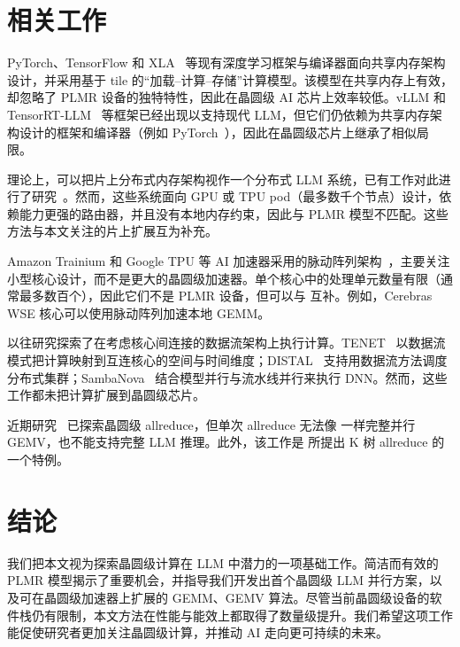 \section{相关工作}
\vspace{-0.2cm}

PyTorch、TensorFlow 和 XLA~\cite{pytorch,tensorflow,xla,flextensor,tvm,ansor,roller,rammer,welder,ladder} 等现有深度学习框架与编译器面向共享内存架构设计，并采用基于 tile 的“加载--计算--存储”计算模型。该模型在共享内存上有效，却忽略了 PLMR 设备的独特特性，因此在晶圆级 AI 芯片上效率较低。vLLM 和 TensorRT-LLM~\cite{vllm,tensorrt-llm} 等框架已经出现以支持现代 LLM，但它们仍依赖为共享内存架构设计的框架和编译器（例如 PyTorch~\cite{pytorch}），因此在晶圆级芯片上继承了相似局限。

 理论上，可以把片上分布式内存架构视作一个分布式 LLM 系统，已有工作对此进行了研究~\cite{alpa,alpaserver,vllm,google2023efficiently,tensorrt-llm,loongserve}。然而，这些系统面向 GPU 或 TPU pod（最多数千个节点）设计，依赖能力更强的路由器，并且没有本地内存约束，因此与 PLMR 模型不匹配。这些方法与本文关注的片上扩展互为补充。

 Amazon Trainium 和 Google TPU 等 AI 加速器采用的脉动阵列架构~\cite{resa}，主要关注小型核心设计，而不是更大的晶圆级加速器。单个核心中的处理单元数量有限（通常最多数百个），因此它们不是 PLMR 设备，但可以与 \sys 互补。例如，Cerebras WSE 核心可以使用脉动阵列加速本地 GEMM。

以往研究探索了在考虑核心间连接的数据流架构上执行计算。TENET~\cite{tenet} 以数据流模式把计算映射到互连核心的空间与时间维度；DISTAL~\cite{distal} 支持用数据流方法调度分布式集群；SambaNova~\cite{sambanova} 结合模型并行与流水线并行来执行 DNN。然而，这些工作都未把计算扩展到晶圆级芯片。

 近期研究~\cite{wafer-reduce} 已探索晶圆级 allreduce，但单次 allreduce 无法像 \sys 一样完整并行 GEMV，也不能支持完整 LLM 推理。此外，该工作是 \sys 所提出 K 树 allreduce 的一个特例。

\vspace{-0.3cm}
\section{结论}

我们把本文视为探索晶圆级计算在 LLM 中潜力的一项基础工作。简洁而有效的 PLMR 模型揭示了重要机会，并指导我们开发出首个晶圆级 LLM 并行方案，以及可在晶圆级加速器上扩展的 GEMM、GEMV 算法。尽管当前晶圆级设备的软件栈仍有限制，本文方法在性能与能效上都取得了数量级提升。我们希望这项工作能促使研究者更加关注晶圆级计算，并推动 AI 走向更可持续的未来。

